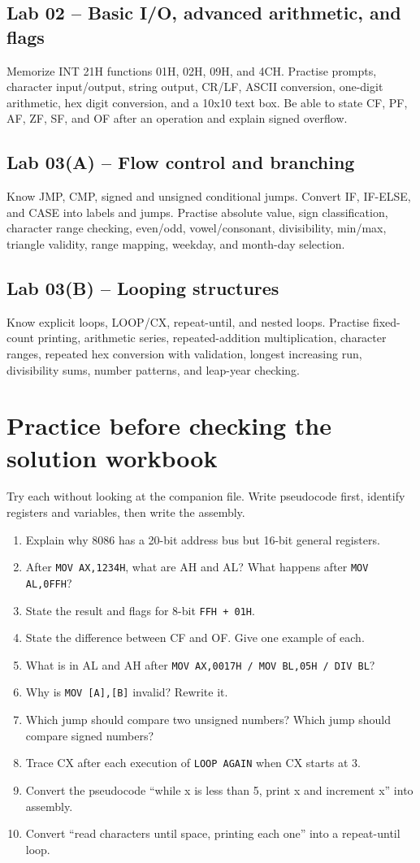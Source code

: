 \documentclass[11pt,a4paper]{article}
\begin{document}
\subsection{Lab 02 -- Basic I/O, advanced arithmetic, and flags}
Memorize INT 21H functions 01H, 02H, 09H, and 4CH. Practise prompts, character input/output, string output, CR/LF, ASCII conversion, one-digit arithmetic, hex digit conversion, and a 10x10 text box. Be able to state CF, PF, AF, ZF, SF, and OF after an operation and explain signed overflow.

\subsection{Lab 03(A) -- Flow control and branching}
Know JMP, CMP, signed and unsigned conditional jumps. Convert IF, IF-ELSE, and CASE into labels and jumps. Practise absolute value, sign classification, character range checking, even/odd, vowel/consonant, divisibility, min/max, triangle validity, range mapping, weekday, and month-day selection.

\subsection{Lab 03(B) -- Looping structures}
Know explicit loops, LOOP/CX, repeat-until, and nested loops. Practise fixed-count printing, arithmetic series, repeated-addition multiplication, character ranges, repeated hex conversion with validation, longest increasing run, divisibility sums, number patterns, and leap-year checking.

\section{Practice before checking the solution workbook}
Try each without looking at the companion file. Write pseudocode first, identify registers and variables, then write the assembly.
\begin{enumerate}
\item Explain why 8086 has a 20-bit address bus but 16-bit general registers.
\item After \texttt{MOV AX,1234H}, what are AH and AL? What happens after \texttt{MOV AL,0FFH}?
\item State the result and flags for 8-bit \texttt{FFH + 01H}.
\item State the difference between CF and OF. Give one example of each.
\item What is in AL and AH after \texttt{MOV AX,0017H / MOV BL,05H / DIV BL}?
\item Why is \texttt{MOV [A],[B]} invalid? Rewrite it.
\item Which jump should compare two unsigned numbers? Which jump should compare signed numbers?
\item Trace CX after each execution of \texttt{LOOP AGAIN} when CX starts at 3.
\item Convert the pseudocode ``while x is less than 5, print x and increment x'' into assembly.
\item Convert ``read characters until space, printing each one'' into a repeat-until loop.
\end{enumerate}
\end{document}
